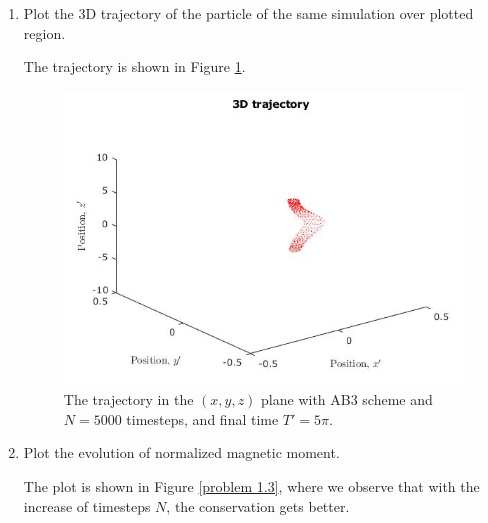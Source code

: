 \documentclass{article}
\begin{document}
\begin{enumerate}
\begin{enumerate}
\item
Plot the 3D trajectory of the particle of the same simulation over plotted region.

The trajectory is shown in Figure \ref{problem 1.2}.
\begin{figure}[h]
\centering
\vbox{
\includegraphics[scale=0.4]{problem4a/trajectory_3d_5000.jpg}
}
\caption{The trajectory in the $(x, y, z)$ plane with AB3 scheme and $N=5000$ timesteps, and final time $T' = 5\pi$.}
\label{problem 1.2}
\end{figure}

\item Plot the evolution of normalized magnetic moment.

The plot is shown in Figure \ref{problem 1.3}, where we observe that with the increase of timesteps $N$, the conservation gets better.


\end{enumerate}
\end{enumerate}
\end{document}
